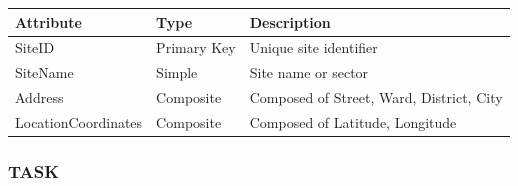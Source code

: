 \documentclass[a4paper,12pt]{report}
\newcounter{none} %
\begin{document}
{\def\LTcaptype{none} %
\begin{longtable}[]{@{}
  >{\raggedright\arraybackslash}p{}
  >{\raggedright\arraybackslash}p{}
  >{\raggedright\arraybackslash}p{}@{}}
\toprule\noalign{}
\begin{minipage}[b]{\linewidth}\raggedright
Attribute
\end{minipage} & \begin{minipage}[b]{\linewidth}\raggedright
Type
\end{minipage} & \begin{minipage}[b]{\linewidth}\raggedright
Description
\end{minipage} \\
\midrule\noalign{}
\endhead
\bottomrule\noalign{}
\endlastfoot
SiteID & Primary Key & Unique site identifier \\
SiteName & Simple & Site name or sector \\
Address & Composite & Composed of Street, Ward, District, City \\
LocationCoordinates & Composite & Composed of Latitude, Longitude \\
\end{longtable}
}

\subsubsection{TASK}\label{task}
\end{document}
